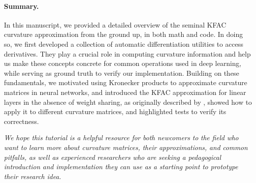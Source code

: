 \paragraph{Summary.} In this manuscript, we provided a detailed overview of the seminal KFAC curvature approximation from the ground up, in both math and code.
In doing so, we first developed a collection of automatic differentiation utilities to access derivatives.
They play a crucial role in computing curvature information and help us make these concepts concrete for common operations used in deep learning, while serving as ground truth to verify our implementation.
Building on these fundamentals, we motivated using Kronecker products to approximate curvature matrices in neural networks, and introduced the KFAC approximation for linear layers in the absence of weight sharing, as originally described by \citet{martens2015optimizing}, showed how to apply it to different curvature matrices, and highlighted tests to verify its correctness.

\emph{We hope this tutorial is a helpful resource for both newcomers to the field who want to learn more about curvature matrices, their approximations, and common pitfalls, as well as experienced researchers who are seeking a pedagogical introduction and implementation they can use as a starting point to prototype their research idea.}

